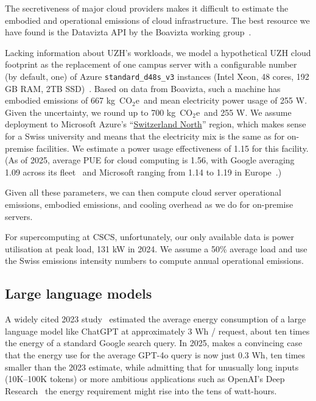 \documentclass[11pt]{article}
\newcommand{\coe}{CO$_2$e}
\newcommand{\gcoe}{g~\coe}
\newcommand{\kgcoe}{k\gcoe}
\let\cite\parencite
\begin{document}
The secretiveness of major cloud providers makes it difficult to estimate the embodied and operational emissions of cloud infrastructure. The best resource we have found is the Datavizta API by the Boavizta working group~\cite{boavizta:api}.

Lacking information about UZH's workloads, we model a hypothetical UZH cloud footprint as the replacement of one campus server with a configurable number (by default, one) of Azure {\tt standard\_d48s\_v3} instances (Intel Xeon, 48 cores, 192 GB RAM, 2TB SSD)~\cite{msftvms}. Based on data from Boavizta, such a machine has embodied emissions of 667 \kgcoe\ and mean electricity power usage of 255 W. Given the uncertainty, we round up to 700 \kgcoe\ and 255 W. We assume deployment to Microsoft Azure's ``\href{https://datacenters.microsoft.com/globe/explore?info=region_switzerlandnorth}{Switzerland North}'' region, which makes sense for a Swiss university and means that the electricity mix is the same as for on-premise facilities. We estimate a power usage effectiveness of 1.15 for this facility. (As of 2025, average PUE for cloud computing is 1.56, with Google averaging 1.09 across its fleet~\cite{google:datacenter:efficiency} and Microsoft ranging from 1.14 to 1.19 in Europe~\cite{microsoft:datacenter:efficiency}.)

Given all these parameters, we can then compute cloud server operational emissions, embodied emissions, and cooling overhead as we do for on-premise servers.

For supercomputing at CSCS, unfortunately, our only available data is power utilisation at peak load, 131 kW in 2024. We assume a 50\% average load and use the Swiss emissions intensity numbers to compute annual operational emissions.

\subsection{Large language models}

A widely cited 2023 study~\cite{devries2023growing} estimated the average energy consumption of a large language model like ChatGPT at approximately 3 Wh / request, about ten times the energy of a standard Google search query. In 2025, \textcite{epoch2025howmuchenergydoeschatgptuse} makes a convincing case that the energy use for the average GPT-4o query is now just 0.3 Wh, ten times smaller than the 2023 estimate, while admitting that for unusually long inputs (10K--100K tokens) or more ambitious applications such as OpenAI's Deep Research~\cite{oai:deepresearch} the energy requirement might rise into the tens of watt-hours.
\end{document}
